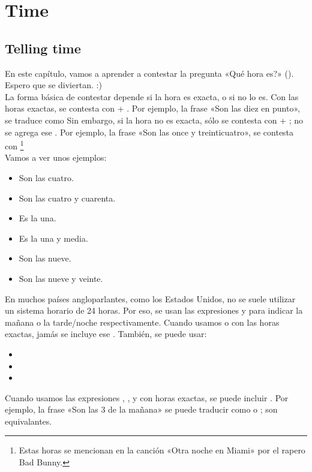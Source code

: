 \chapter{Time}

\section{Telling time}

En este cap\'itulo, vamos a aprender a contestar la pregunta «\textquestiondown Qu\'e hora es?» ().
Espero que se diviertan. :) \\

La forma b\'asica de contestar depende si la hora es exacta, o si no lo es.
Con las horas exactas, se contesta con  + .
Por ejemplo, la frase «Son las diez en punto», se traduce como 
Sin embargo, si la hora no es exacta, s\'olo se contesta con  + ; no se agrega ese .
Por ejemplo, la frase «Son las once y treinticuatro», se contesta con \footnote{Estas horas se mencionan en la canci\'on «Otra noche en Miami» por el rapero Bad Bunny.} \\

Vamos a ver unos ejemplos:
\begin{itemize}
	\item Son las cuatro. \arr {}
	\item Son las cuatro y cuarenta. \arr {}
	\item Es la una. \arr {}
	\item Es la una y media. \arr {}
	\item Son las nueve. \arr {}
	\item Son las nueve y veinte. \arr {}
\end{itemize}

En muchos pa\'ises angloparlantes, como los Estados Unidos, no se suele utilizar un sistema horario de 24 horas.
Por eso, se usan las expresiones  y  para indicar la mañana o la tarde/noche respectivamente.
Cuando usamos  o  con las horas exactas, jam\'as se incluye ese .
Tambi\'en, se puede usar:
\begin{itemize}
	\item {} \arr {}
	\item {} \arr {}
	\item {} \arr {}
\end{itemize}
Cuando usamos las expresiones , , y  con
horas exactas, se puede incluir . Por ejemplo, la frase «Son las 3 de la ma\~nana» se puede traducir
como  o ; son equivalantes. \\

